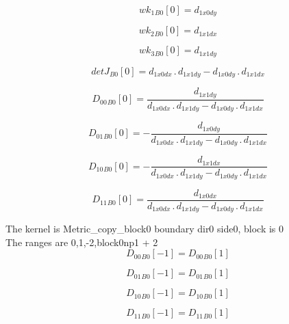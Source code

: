 \documentclass{article}
\begin{document}
\begin{dmath}{wk_{1}{_{B0}}}[{0}] = d_{1 x0 dy}\end{dmath}

\begin{dmath}{wk_{2}{_{B0}}}[{0}] = d_{1 x1 dx}\end{dmath}

\begin{dmath}{wk_{3}{_{B0}}}[{0}] = d_{1 x1 dy}\end{dmath}

\begin{dmath}{detJ{_{B0}}}[{0}] = d_{1 x0 dx} \,.\, d_{1 x1 dy} - d_{1 x0 dy} \,.\, d_{1 x1 dx}\end{dmath}

\begin{dmath}{D_{00}{_{B0}}}[{0}] = \frac{d_{1 x1 dy}}{d_{1 x0 dx} \,.\, d_{1 x1 dy} - d_{1 x0 dy} \,.\, d_{1 x1 dx}}\end{dmath}

\begin{dmath}{D_{01}{_{B0}}}[{0}] = - \frac{d_{1 x0 dy}}{d_{1 x0 dx} \,.\, d_{1 x1 dy} - d_{1 x0 dy} \,.\, d_{1 x1 dx}}\end{dmath}

\begin{dmath}{D_{10}{_{B0}}}[{0}] = - \frac{d_{1 x1 dx}}{d_{1 x0 dx} \,.\, d_{1 x1 dy} - d_{1 x0 dy} \,.\, d_{1 x1 dx}}\end{dmath}

\begin{dmath}{D_{11}{_{B0}}}[{0}] = \frac{d_{1 x0 dx}}{d_{1 x0 dx} \,.\, d_{1 x1 dy} - d_{1 x0 dy} \,.\, d_{1 x1 dx}}\end{dmath}

\noindent The kernel is Metric_copy_block0 boundary dir0 side0, block is 0\\\noindent The ranges are 0,1,-2,block0np1 + 2\\\begin{dmath}{D_{00}{_{B0}}}[{-1}] = {D_{00}{_{B0}}}[{1}]\end{dmath}

\begin{dmath}{D_{01}{_{B0}}}[{-1}] = {D_{01}{_{B0}}}[{1}]\end{dmath}

\begin{dmath}{D_{10}{_{B0}}}[{-1}] = {D_{10}{_{B0}}}[{1}]\end{dmath}

\begin{dmath}{D_{11}{_{B0}}}[{-1}] = {D_{11}{_{B0}}}[{1}]\end{dmath}
\end{document}
